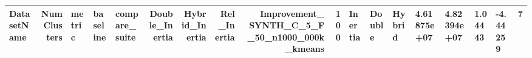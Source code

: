 \begin{tabular}{lrlllrrrrr}
\toprule
DatasetName & NumClusters & metric & baseline & compare_suite & Double_Inertia & Hybrid_Inertia & Rel_Inertia & Improvement_%
\midrule
SYNTH_C_5_F_50_n1000_000k_kmeans & 100 & Inertia & Double & Hybrid & 4.61875e+07 & 4.82394e+07 & 1.04443 & -4.44259 & 7 \\
\bottomrule
\end{tabular}
